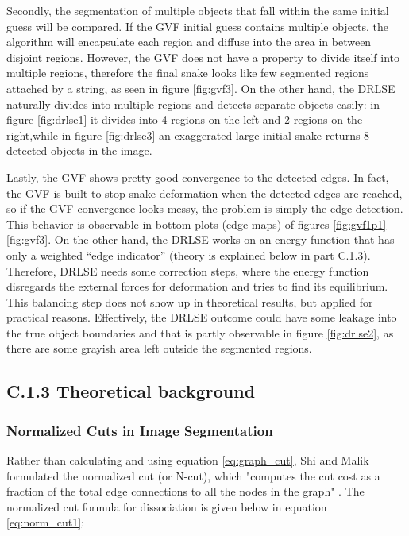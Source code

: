 \documentclass{article}
\begin{document}
Secondly, the segmentation of multiple objects that fall within the same initial guess will be compared. If the GVF initial guess contains multiple objects, the algorithm will encapsulate each region and diffuse into the area in between disjoint regions. However, the GVF does not have a property to divide itself into multiple regions, therefore the final snake looks like few segmented regions attached by a string, as seen in figure \ref{fig:gvf3}. On the other hand, the DRLSE naturally divides into multiple regions and detects separate objects easily: in figure \ref{fig:drlse1} it divides into 4 regions on the left and 2 regions on the right,while in figure \ref{fig:drlse3} an exaggerated large initial snake returns 8 detected objects in the image.

Lastly, the GVF shows pretty good convergence to the detected edges. In fact, the GVF is built to stop snake deformation when the detected edges are reached, so if the GVF convergence looks messy, the problem is simply the edge detection. This behavior is observable in bottom plots (edge maps) of figures \ref{fig:gvf1p1}-\ref{fig:gvf3}. On the other hand, the DRLSE works on an energy function that has only a weighted ``edge indicator'' (theory is explained below in part C.1.3). Therefore, DRLSE needs some correction steps, where the energy function disregards the external forces for deformation and tries to find its equilibrium. This balancing step does not show up in theoretical results, but applied for practical reasons. Effectively, the DRLSE outcome could have some leakage into the true object boundaries and that is partly observable in figure \ref{fig:drlse2}, as there are some grayish area left outside the segmented regions.


\subsection*{C.1.3 Theoretical background}



\subsubsection*{Normalized Cuts in Image Segmentation}

Rather than calculating and using equation \ref{eq:graph_cut}, Shi and Malik formulated the normalized cut (or N-cut), which "computes the cut cost as a fraction of the total edge connections to all the nodes in the graph" \cite{ncut}. The normalized cut formula for dissociation is given below in equation \ref{eq:norm_cut1}: \cite{ncut}
\end{document}
